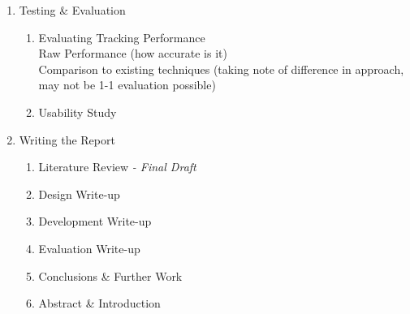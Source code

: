 \begin{notes}
\begin{enumerate}
        \item \label{itm:testing} Testing \& Evaluation
            \begin{enumerate}
                \item \label{itm:performance} Evaluating Tracking Performance \\
                    Raw Performance (how accurate is it)\\
                    Comparison to existing techniques (taking note of difference in approach, may not be 1-1 evaluation possible)
                \item \label{itm:usability} Usability Study
            \end{enumerate}
        \item \label{itm:report} Writing the Report
            \begin{enumerate}
                \item \label{itm:lit_review_final} Literature Review \textit{- Final Draft}
                \item \label{itm:design_write} Design Write-up
                \item \label{itm:dev_write} Development Write-up
                \item \label{itm:eval_write} Evaluation Write-up
                \item \label{itm:conclusion_write} Conclusions \& Further Work
                \item \label{itm:abstract_and_intro_write} Abstract \& Introduction
            \end{enumerate}
    \end{enumerate}
\end{notes}

